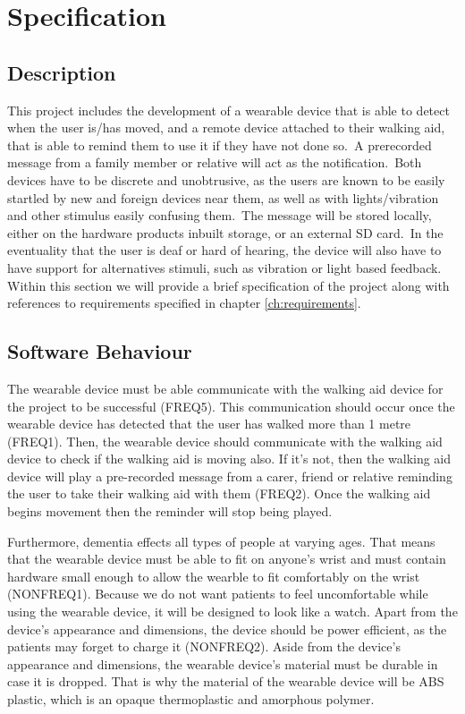 \chapter{Specification}\label{ch:specification}
    \section{Description}

        This project includes the development of a wearable device that is able to detect when the user is/has moved,
        and a remote device attached to their walking aid, that is able to remind them to use it if they have not done
        so.\ A prerecorded message from a family member or relative will act as the notification.\ Both devices have to
        be discrete and unobtrusive, as the users are known to be easily startled by new and foreign devices near them,
        as well as with lights/vibration and other stimulus easily confusing them.\ The message will be stored locally,
        either on the hardware products inbuilt storage, or an external SD card.\ In the eventuality that the user is
        deaf or hard of hearing, the device will also have to have support for alternatives stimuli, such as vibration
        or light based feedback. Within this section we will provide a brief specification of the project along with
        references to requirements specified in chapter \ref{ch:requirements}.

    \section{Software Behaviour}
        The wearable device must be able communicate with the walking aid device for the project to be successful
        (FREQ5). This communication should occur once the wearable device has detected that the user has walked more
        than 1 metre (FREQ1). Then, the wearable device should communicate with the walking aid device to check if the
        walking aid is moving also. If it's not, then the walking aid device will play a pre-recorded message from a
        carer, friend or relative reminding the user to take their walking aid with them (FREQ2). Once the walking aid
        begins movement then the reminder will stop being played.

        Furthermore, dementia effects all types of people at varying ages. That means that the wearable device must be
        able to fit on anyone's wrist and must contain hardware small enough to allow the wearble to fit comfortably on
        the wrist (NONFREQ1). Because we do not want patients to feel uncomfortable while using the wearable device, it
        will be designed to look like a watch. Apart from the device's appearance and dimensions, the device should be
        power efficient, as the patients may forget to charge it (NONFREQ2). Aside from the device's appearance and
        dimensions, the wearable device's material must be durable in  case it is dropped. That is why the material of
        the wearable device will be ABS plastic, which is an opaque thermoplastic and amorphous polymer.

